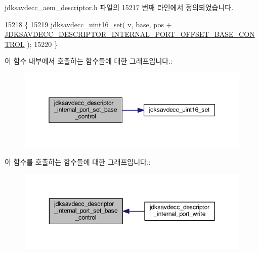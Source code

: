 jdksavdecc\+\_\+aem\+\_\+descriptor.\+h 파일의 15217 번째 라인에서 정의되었습니다.


\begin{DoxyCode}
15218 \{
15219     \hyperlink{group__endian_ga14b9eeadc05f94334096c127c955a60b}{jdksavdecc\_uint16\_set}( v, base, pos + 
      \hyperlink{group__descriptor__internal__port_ga833e549c8870731a9bf9614b0da8d8de}{JDKSAVDECC\_DESCRIPTOR\_INTERNAL\_PORT\_OFFSET\_BASE\_CONTROL}
       );
15220 \}
\end{DoxyCode}


이 함수 내부에서 호출하는 함수들에 대한 그래프입니다.\+:
\nopagebreak
\begin{figure}[H]
\begin{center}
\leavevmode
\includegraphics[width=350pt]{group__descriptor__internal__port_ga6ec8e8f90851221be130e3532c4c4ec5_cgraph}
\end{center}
\end{figure}




이 함수를 호출하는 함수들에 대한 그래프입니다.\+:
\nopagebreak
\begin{figure}[H]
\begin{center}
\leavevmode
\includegraphics[width=350pt]{group__descriptor__internal__port_ga6ec8e8f90851221be130e3532c4c4ec5_icgraph}
\end{center}
\end{figure}



